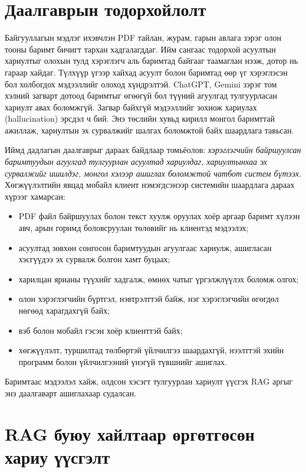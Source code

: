 \documentclass[../main.tex]{subfiles}
\begin{document}
\section{Даалгаврын тодорхойлолт}

Байгууллагын мэдлэг ихэвчлэн PDF тайлан, журам, гарын авлага зэрэг олон тооны
баримт бичигт тархан хадгалагддаг. Ийм сангаас тодорхой асуултын хариултыг
олохын тулд хэрэглэгч аль баримтад байгааг таамаглан нээж, дотор нь гараар
хайдаг. Түлхүүр үгээр хайхад асуулт болон баримтад өөр үг хэрэглэсэн бол
холбогдох мэдээллийг олоход хүндрэлтэй. ChatGPT, Gemini зэрэг том хэлний
загварт дотоод баримтыг өгөөгүй бол түүний агуулгад тулгуурласан хариулт
авах боломжгүй. Загвар байхгүй мэдээллийг зохиож хариулах (hallucination)
эрсдэл ч бий. Энэ төслийн хувьд кирилл монгол баримттай ажиллаж,
хариултын эх сурвалжийг шалгах боломжтой байх шаардлага тавьсан.

Иймд дадлагын даалгаврыг дараах байдлаар томьёолов: \emph{хэрэглэгчийн
байршуулсан баримтуудын агуулгад тулгуурлан асуултад хариулдаг, хариултынхаа
эх сурвалжийг ишилдэг, монгол хэлээр ашиглах боломжтой чатбот систем бүтээх.}
Хөгжүүлэлтийн явцад мобайл клиент нэмэгдсэнээр системийн шаардлага
дараах хүрээг хамарсан:

\begin{itemize}
\item PDF файл байршуулах болон текст хуулж оруулах хоёр аргаар баримт хүлээн
авч, арын горимд боловсруулан төлөвийг нь клиентэд мэдээлэх;
\item асуултад зөвхөн сонгосон баримтуудын агуулгаас хариулж, ашигласан
хэсгүүдээ эх сурвалж болгон хамт буцаах;
\item харилцан ярианы түүхийг хадгалж, өмнөх чатыг үргэлжлүүлэх боломж олгох;
\item олон хэрэглэгчийн бүртгэл, нэвтрэлттэй байж, нэг хэрэглэгчийн өгөгдөл
нөгөөд харагдахгүй байх;
\item вэб болон мобайл гэсэн хоёр клиенттэй байх;
\item хөгжүүлэлт, туршилтад төлбөртэй үйлчилгээ шаардахгүй, нээлттэй эхийн
программ болон үйлчилгээний үнэгүй түвшнийг ашиглах.
\end{itemize}

Баримтаас мэдээлэл хайж, олдсон хэсэгт тулгуурлан хариулт үүсгэх RAG
аргыг энэ даалгаварт ашиглахаар судалсан.

\section{RAG буюу хайлтаар өргөтгөсөн хариу үүсгэлт}
\end{document}
